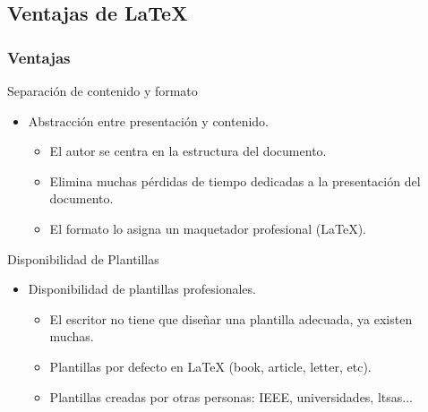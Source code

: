 \documentclass[aspectratio=43]{beamer}%
\begin{document}
\subsection{Ventajas de \LaTeX{}}
\begin{frame}[fragile]
\frametitle{\textbf{Ventajas}}
\justifying
 \begin{block}{Separación de contenido y formato}
\begin{itemize}\justifying
  \item Abstracción entre presentación y contenido.
  \begin{itemize}\justifying
  \item El autor se centra en la estructura del documento.
  \item Elimina muchas pérdidas de tiempo dedicadas a la presentación del documento.
  \item El formato lo asigna un maquetador profesional (\LaTeX{}).
\end{itemize}

\end{itemize}

\end{block}

\begin{block}{Disponibilidad de Plantillas}
\begin{itemize}\justifying
  \item Disponibilidad de plantillas profesionales.
  \begin{itemize}\justifying
  \item El escritor no tiene que diseñar una plantilla adecuada, ya existen muchas.
  \item Plantillas por defecto en \LaTeX{} (book, article, letter, etc).
  \item Plantillas creadas por otras personas: IEEE, universidades, ltsas...
\end{itemize}

\end{itemize}

\end{block}
\end{frame}
\end{document}
